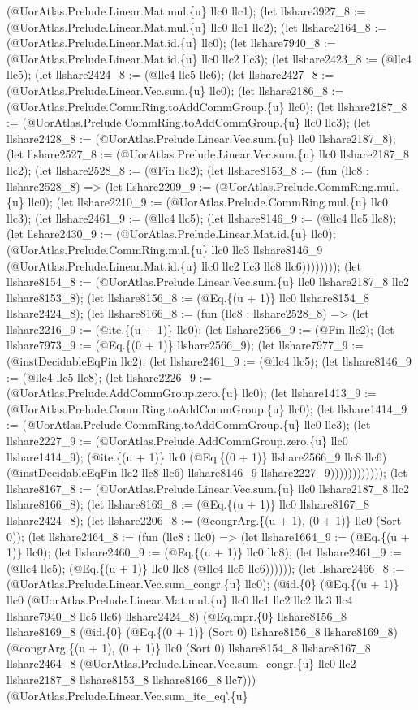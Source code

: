 \documentclass[11pt]{article}
\begin{document}
(@UorAtlas.Prelude.Linear.Mat.mul.\{u\} llc0 llc1); (let llshare3927\_8 := (@UorAtlas.Prelude.Linear.Mat.mul.\{u\} llc0 llc1 llc2); (let llshare2164\_8 := (@UorAtlas.Prelude.Linear.Mat.id.\{u\} llc0); (let llshare7940\_8 := (@UorAtlas.Prelude.Linear.Mat.id.\{u\} llc0 llc2 llc3); (let llshare2423\_8 := (@llc4 llc5); (let llshare2424\_8 := (@llc4 llc5 llc6); (let llshare2427\_8 := (@UorAtlas.Prelude.Linear.Vec.sum.\{u\} llc0); (let llshare2186\_8 := (@UorAtlas.Prelude.CommRing.toAddCommGroup.\{u\} llc0); (let llshare2187\_8 := (@UorAtlas.Prelude.CommRing.toAddCommGroup.\{u\} llc0 llc3); (let llshare2428\_8 := (@UorAtlas.Prelude.Linear.Vec.sum.\{u\} llc0 llshare2187\_8); (let llshare2527\_8 := (@UorAtlas.Prelude.Linear.Vec.sum.\{u\} llc0 llshare2187\_8 llc2); (let llshare2528\_8 := (@Fin llc2); (let llshare8153\_8 := (fun (llc8 : llshare2528\_8) => (let llshare2209\_9 := (@UorAtlas.Prelude.CommRing.mul.\{u\} llc0); (let llshare2210\_9 := (@UorAtlas.Prelude.CommRing.mul.\{u\} llc0 llc3); (let llshare2461\_9 := (@llc4 llc5); (let llshare8146\_9 := (@llc4 llc5 llc8); (let llshare2430\_9 := (@UorAtlas.Prelude.Linear.Mat.id.\{u\} llc0); (@UorAtlas.Prelude.CommRing.mul.\{u\} llc0 llc3 llshare8146\_9 (@UorAtlas.Prelude.Linear.Mat.id.\{u\} llc0 llc2 llc3 llc8 llc6)))))))); (let llshare8154\_8 := (@UorAtlas.Prelude.Linear.Vec.sum.\{u\} llc0 llshare2187\_8 llc2 llshare8153\_8); (let llshare8156\_8 := (@Eq.\{(u + 1)\} llc0 llshare8154\_8 llshare2424\_8); (let llshare8166\_8 := (fun (llc8 : llshare2528\_8) => (let llshare2216\_9 := (@ite.\{(u + 1)\} llc0); (let llshare2566\_9 := (@Fin llc2); (let llshare7973\_9 := (@Eq.\{(0 + 1)\} llshare2566\_9); (let llshare7977\_9 := (@instDecidableEqFin llc2); (let llshare2461\_9 := (@llc4 llc5); (let llshare8146\_9 := (@llc4 llc5 llc8); (let llshare2226\_9 := (@UorAtlas.Prelude.AddCommGroup.zero.\{u\} llc0); (let llshare1413\_9 := (@UorAtlas.Prelude.CommRing.toAddCommGroup.\{u\} llc0); (let llshare1414\_9 := (@UorAtlas.Prelude.CommRing.toAddCommGroup.\{u\} llc0 llc3); (let llshare2227\_9 := (@UorAtlas.Prelude.AddCommGroup.zero.\{u\} llc0 llshare1414\_9); (@ite.\{(u + 1)\} llc0 (@Eq.\{(0 + 1)\} llshare2566\_9 llc8 llc6) (@instDecidableEqFin llc2 llc8 llc6) llshare8146\_9 llshare2227\_9)))))))))))); (let llshare8167\_8 := (@UorAtlas.Prelude.Linear.Vec.sum.\{u\} llc0 llshare2187\_8 llc2 llshare8166\_8); (let llshare8169\_8 := (@Eq.\{(u + 1)\} llc0 llshare8167\_8 llshare2424\_8); (let llshare2206\_8 := (@congrArg.\{(u + 1), (0 + 1)\} llc0 (Sort 0)); (let llshare2464\_8 := (fun (llc8 : llc0) => (let llshare1664\_9 := (@Eq.\{(u + 1)\} llc0); (let llshare2460\_9 := (@Eq.\{(u + 1)\} llc0 llc8); (let llshare2461\_9 := (@llc4 llc5); (@Eq.\{(u + 1)\} llc0 llc8 (@llc4 llc5 llc6)))))); (let llshare2466\_8 := (@UorAtlas.Prelude.Linear.Vec.sum\_congr.\{u\} llc0); (@id.\{0\} (@Eq.\{(u + 1)\} llc0 (@UorAtlas.Prelude.Linear.Mat.mul.\{u\} llc0 llc1 llc2 llc2 llc3 llc4 llshare7940\_8 llc5 llc6) llshare2424\_8) (@Eq.mpr.\{0\} llshare8156\_8 llshare8169\_8 (@id.\{0\} (@Eq.\{(0 + 1)\} (Sort 0) llshare8156\_8 llshare8169\_8) (@congrArg.\{(u + 1), (0 + 1)\} llc0 (Sort 0) llshare8154\_8 llshare8167\_8 llshare2464\_8 (@UorAtlas.Prelude.Linear.Vec.sum\_congr.\{u\} llc0 llc2 llshare2187\_8 llshare8153\_8 llshare8166\_8 llc7))) (@UorAtlas.Prelude.Linear.Vec.sum\_ite\_eq'.\{u\} 
\end{document}
